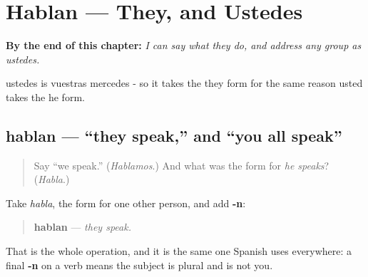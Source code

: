 
\chapter{Hablan --- They, and Ustedes}
\label{ch:spanish-hablan}

\begin{chapteropening}
\textbf{By the end of this chapter:} \emph{I can say what they do, and address any group as ustedes.}

ustedes is vuestras mercedes - so it takes the they form for the same reason usted takes the he form.
\end{chapteropening}

\section[hablan]{hablan — \textquotedblleft{}they speak,\textquotedblright{} and \textquotedblleft{}you all speak\textquotedblright{}}

\label{lesson:ES-C07-hablan}



\begin{quote}
Say \textquotedblleft{}we speak.\textquotedblright{} (\emph{Hablamos}.) And what was the form for \emph{he speaks}? (\emph{Habla}.)
\end{quote}

\begin{grammarlens}[title={Grammar Lens: add the plural -n}]
Take \emph{habla}, the form for one other person, and add \textbf{-n}:

\begin{quote}
\textbf{hablan} — \emph{they speak.}
\end{quote}

That is the whole operation, and it is the same one Spanish uses everywhere: a final \textbf{-n} on a verb means the subject is plural and is not you.
\end{grammarlens}

